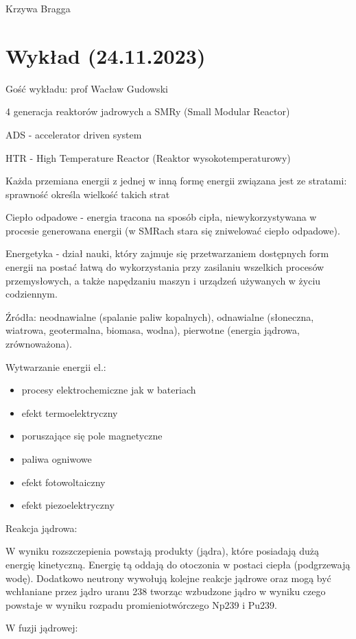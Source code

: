 \documentclass{article}
\begin{document}
Krzywa Bragga

\section{Wykład (24.11.2023)}

Gość wykładu: prof Wacław Gudowski

4 generacja reaktorów jadrowych a SMRy (Small Modular Reactor)

ADS - accelerator driven system

HTR - High Temperature Reactor (Reaktor wysokotemperaturowy)

Każda przemiana energii z jednej w inną formę energii związana jest ze stratami: sprawność określa wielkość takich strat

Ciepło odpadowe - energia tracona na sposób cipła, niewykorzystywana w procesie generowana energii (w SMRach stara się zniwelować ciepło odpadowe).

Energetyka - dział nauki, który zajmuje się przetwarzaniem dostępnych form energii na postać łatwą do wykorzystania przy zasilaniu wszelkich procesów przemysłowych, a także napędzaniu maszyn i urządzeń używanych w życiu codziennym.

Źródła: neodnawialne (spalanie paliw kopalnych), odnawialne (słoneczna, wiatrowa, geotermalna, biomasa, wodna), pierwotne (energia jądrowa, zrównoważona).

Wytwarzanie energii el.:
\begin{itemize}
    \item procesy elektrochemiczne jak w bateriach
    \item efekt termoelektryczny
    \item poruszające się pole magnetyczne
    \item paliwa ogniwowe
    \item efekt fotowoltaiczny
    \item efekt piezoelektryczny
\end{itemize}

Reakcja jądrowa:

W wyniku rozszczepienia powstają produkty (jądra), które posiadają dużą energię kinetyczną. Energię tą oddają do otoczonia w postaci ciepła (podgrzewają wodę). Dodatkowo neutrony wywołują kolejne reakcje jądrowe oraz mogą być wchłaniane przez jądro uranu 238 tworząc wzbudzone jądro w wyniku czego powstaje w wyniku rozpadu promieniotwórczego Np239 i Pu239.

W fuzji jądrowej:
\end{document}
